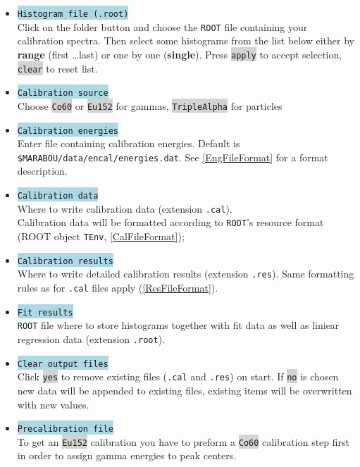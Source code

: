 \documentclass[10pt]{article}
\newcommand{\blue}[1]{\colorbox{lightblue}{\texttt{#1}}}
\newcommand{\gray}[1]{\colorbox{lightgray}{\texttt{#1}}}
\begin{document}
\begin{center}
\begin{itemize}
\setlength{\rightmargin}{1em}%
\setlength{\leftmargin}{2em}%
\setlength{\itemsep}{0pt}%
\setlength{\parskip}{1mm}%
\setlength{\partopsep}{0pt}%
\setlength{\parsep}{0pt}%
\setlength{\topsep}{0pt}%
\item	\blue{Histogram file (.root)}\\
	Click on the folder button and choose the \texttt{ROOT} file containing your calibration spectra.
	Then select some histograms from the list below either by \textbf{range} (first \dots last) or one by one (\textbf{single}).
	Press \gray{apply} to accept selection, \gray{clear} to reset list.
\item	\blue{Calibration source}\\
	Choose \gray{Co60} or \gray{Eu152} for gammas, \gray{TripleAlpha} for particles
\item	\blue{Calibration energies}\\
	Enter file containing calibration energies. Default is \texttt{\$MARABOU/data/encal/energies.dat}.
	See \ref{EngFileFormat} for a format description.
\item	\blue{Calibration data}\\
	Where to write calibration data (extension \texttt{.cal}).\\
	Calibration data will be formatted according to \texttt{ROOT}'s resource format (ROOT object \texttt{TEnv}, \ref{CalFileFormat});
\item	\blue{Calibration results}\\
	Where to write detailed calibration results (extension \texttt{.res}).
	Same formatting rules as for \texttt{.cal} files apply (\ref{ResFileFormat}).
\item	\blue{Fit results}\\
	\texttt{ROOT} file where to store histograms together with fit data as well as liniear regression data (extension \texttt{.root}).
\item	\blue{Clear output files}\\
	Click \gray{yes} to remove existing files (\texttt{.cal} and \texttt{.res}) on start.
	If \gray{no} is chosen new data will be appended to existing files, existing items will be overwritten with new values.
\item	\blue{Precalibration file}\\
	To get an \gray{Eu152} calibration you have to preform a \gray{Co60} calibration step first in order to assign gamma energies
	to peak centers.

\end{itemize}
\end{center}
\end{document}
